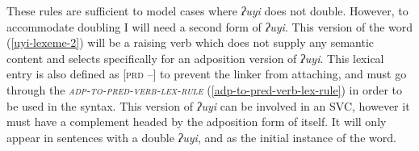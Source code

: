 \ex \label{adp-to-pred-verb-lex-rule}
\xe

These rules are sufficient to model cases where \textit{ʔuyi} does not double. However, to accommodate doubling I will need a second form of \textit{ʔuyi}. This version of the word (\ref{uyi-lexeme-2}) will be a raising verb which does not supply any semantic content and selects specifically for an adposition version of \textit{ʔuyi}. This lexical entry is also defined as [\textsc{prd} --] to prevent the linker from attaching, and must go through the \textsc{\textit{adp-to-pred-verb-lex-rule}} (\ref{adp-to-pred-verb-lex-rule}) in order to be used in the syntax. This version of \textit{ʔuyi} can be involved in an SVC, however it must have a complement headed by the adposition form of itself. It will only appear in sentences with a double \textit{ʔuyi}, and as the initial instance of the word.

\ex \label{uyi-lexeme-2}
\xe 

